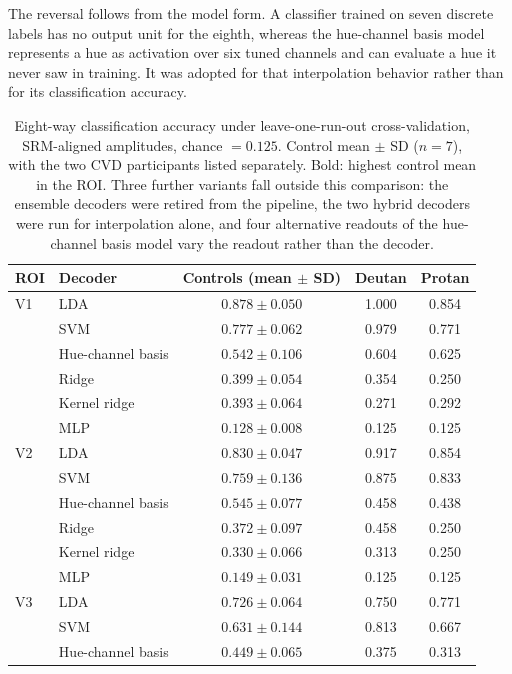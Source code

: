 The reversal follows from the model form. A classifier trained on seven discrete labels has no output unit for the eighth, whereas the hue-channel basis model represents a hue as activation over six tuned channels and can evaluate a hue it never saw in training. It was adopted for that interpolation behavior rather than for its classification accuracy.

\begin{table}[h]
\centering
\caption{Eight-way classification accuracy under leave-one-run-out cross-validation, SRM-aligned amplitudes, chance $= 0.125$. Control mean $\pm$ SD ($n = 7$), with the two CVD participants listed separately. Bold: highest control mean in the ROI. Three further variants fall outside this comparison: the ensemble decoders were retired from the pipeline, the two hybrid decoders were run for interpolation alone, and four alternative readouts of the hue-channel basis model vary the readout rather than the decoder.}
\label{tab:loro_decoders}
\begin{tabular}{llccc}
\toprule
ROI & Decoder & Controls (mean $\pm$ SD) & Deutan & Protan \\
\midrule
V1 & LDA & $\mathbf{0.878 \pm 0.050}$ & 1.000 & 0.854 \\
   & SVM & $0.777 \pm 0.062$ & 0.979 & 0.771 \\
   & Hue-channel basis & $0.542 \pm 0.106$ & 0.604 & 0.625 \\
   & Ridge & $0.399 \pm 0.054$ & 0.354 & 0.250 \\
   & Kernel ridge & $0.393 \pm 0.064$ & 0.271 & 0.292 \\
   & MLP & $0.128 \pm 0.008$ & 0.125 & 0.125 \\
\midrule
V2 & LDA & $\mathbf{0.830 \pm 0.047}$ & 0.917 & 0.854 \\
   & SVM & $0.759 \pm 0.136$ & 0.875 & 0.833 \\
   & Hue-channel basis & $0.545 \pm 0.077$ & 0.458 & 0.438 \\
   & Ridge & $0.372 \pm 0.097$ & 0.458 & 0.250 \\
   & Kernel ridge & $0.330 \pm 0.066$ & 0.313 & 0.250 \\
   & MLP & $0.149 \pm 0.031$ & 0.125 & 0.125 \\
\midrule
V3 & LDA & $\mathbf{0.726 \pm 0.064}$ & 0.750 & 0.771 \\
   & SVM & $0.631 \pm 0.144$ & 0.813 & 0.667 \\
   & Hue-channel basis & $0.449 \pm 0.065$ & 0.375 & 0.313 \\

\end{tabular}
\end{table}
